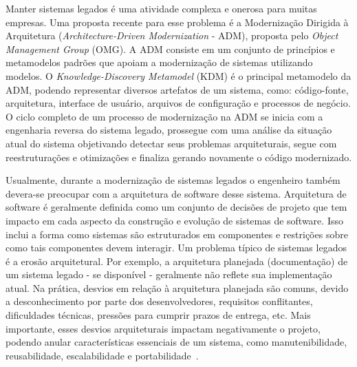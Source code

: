 \documentclass[12pt]{article}
\begin{document}
Manter sistemas legados é uma atividade complexa e onerosa para muitas empresas. Uma proposta recente para esse problema é a Modernização Dirigida à Arquitetura (\textit{Architecture-Driven Modernization} - ADM), proposta pelo \textit{Object Management Group} (OMG). A ADM consiste em um conjunto de princípios e metamodelos padrões que apoiam a modernização de sistemas utilizando modelos. O \textit{Knowledge-Discovery Metamodel} (KDM) é o principal metamodelo da ADM, podendo representar diversos artefatos de um sistema, como: código-fonte, arquitetura, interface de usuário, arquivos de configuração e processos de negócio. O ciclo completo de um processo de modernização na ADM se inicia com a engenharia reversa do sistema legado, prossegue com uma análise da situação atual do sistema objetivando detectar seus problemas arquiteturais, segue com reestruturações e otimizações e finaliza gerando novamente o código modernizado.


Usualmente, durante a modernização de sistemas legados o engenheiro também devera-se preocupar com a arquitetura de software desse sistema. Arquitetura de software é geralmente definida como um conjunto de decisões de projeto que tem impacto em cada aspecto da construção e evolução de sistemas de software. Isso inclui a forma como sistemas são estruturados em componentes e restrições sobre como tais componentes devem interagir. Um problema típico de sistemas legados é a erosão arquitetural. Por exemplo, a arquitetura planejada (documentação) de um sistema legado - se disponível - geralmente não reflete sua implementação atual. Na prática, desvios em relação à arquitetura planejada são comuns, devido a desconhecimento por parte dos desenvolvedores, requisitos conflitantes, dificuldades técnicas, pressões para cumprir prazos de entrega, etc. Mais importante, esses desvios arquiteturais impactam negativamente o projeto, podendo anular características essenciais de um sistema, como manutenibilidade, reusabilidade, escalabilidade e portabilidade~\cite{Passos_2010}.
\end{document}
